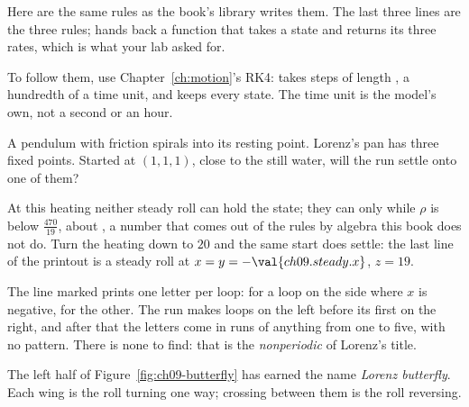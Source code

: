 \noindent
Here are the same rules as the book's library writes them. The last three
lines are the three rules;  hands back a function that takes a
state and returns its three rates, which is what your lab asked for.


\noindent
To follow them, use Chapter~\ref{ch:motion}'s RK4:  takes
steps of length , a hundredth of a time unit, and keeps every state.
The time unit is the model's own, not a second or an hour.


\begin{think}
A pendulum with friction spirals into its resting point. Lorenz's pan has
three fixed points. Started at $(1, 1, 1)$, close to the still water, will
the run settle onto one of them?
\end{think}
At this heating neither steady roll can hold the state; they can only while
$\rho$ is below $\tfrac{470}{19}$, about , a number that
comes out of the rules by algebra this book does not do. Turn the heating
down to $20$ and the same start does settle: the last line of the printout is
a steady roll at $x = y = -\val{ch09.steady.x}$, $z = 19$.


\noindent
The line marked  prints one letter per loop:  for a loop
on the side where $x$ is negative,  for the other. The run makes
 loops on the left before its first on the right, and
after that the letters come in runs of anything from one to five, with no
pattern. There is none to find: that is the \emph{nonperiodic} of Lorenz's
title.


\noindent
The left half of Figure~\ref{fig:ch09-butterfly} has earned the name
\emph{Lorenz butterfly}. Each wing is the roll turning one way; crossing
between them is the roll reversing.

